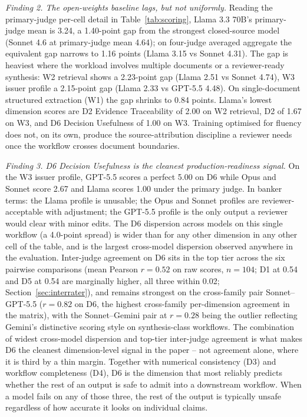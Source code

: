 \documentclass[11pt]{article}
\begin{document}
\textit{Finding 2. The open-weights baseline lags, but not uniformly.} Reading the primary-judge per-cell detail in Table~\ref{tab:scoring}, Llama 3.3 70B's primary-judge mean is 3.24, a 1.40-point gap from the strongest closed-source model (Sonnet 4.6 at primary-judge mean 4.64); on four-judge averaged aggregate the equivalent gap narrows to 1.16 points (Llama 3.15 vs Sonnet 4.31). The gap is heaviest where the workload involves multiple documents or a reviewer-ready synthesis: W2 retrieval shows a 2.23-point gap (Llama 2.51 vs Sonnet 4.74), W3 issuer profile a 2.15-point gap (Llama 2.33 vs GPT-5.5 4.48). On single-document structured extraction (W1) the gap shrinks to 0.84 points. Llama's lowest dimension scores are D2 Evidence Traceability of 2.00 on W2 retrieval, D2 of 1.67 on W3, and D6 Decision Usefulness of 1.00 on W3. Training optimised for fluency does not, on its own, produce the source-attribution discipline a reviewer needs once the workflow crosses document boundaries.

\textit{Finding 3. D6 Decision Usefulness is the cleanest production-readiness signal.} On the W3 issuer profile, GPT-5.5 scores a perfect 5.00 on D6 while Opus and Sonnet score 2.67 and Llama scores 1.00 under the primary judge. In banker terms: the Llama profile is unusable; the Opus and Sonnet profiles are reviewer-acceptable with adjustment; the GPT-5.5 profile is the only output a reviewer would clear with minor edits. The D6 dispersion across models on this single workflow (a 4.0-point spread) is wider than for any other dimension in any other cell of the table, and is the largest cross-model dispersion observed anywhere in the evaluation. Inter-judge agreement on D6 sits in the top tier across the six pairwise comparisons (mean Pearson $r = 0.52$ on raw scores, $n = 104$; D1 at 0.54 and D5 at 0.54 are marginally higher, all three within 0.02; Section~\ref{sec:interrater}), and remains strongest on the cross-family pair Sonnet--GPT-5.5 ($r = 0.82$ on D6, the highest cross-family per-dimension agreement in the matrix), with the Sonnet--Gemini pair at $r = 0.28$ being the outlier reflecting Gemini's distinctive scoring style on synthesis-class workflows. The combination of widest cross-model dispersion and top-tier inter-judge agreement is what makes D6 the cleanest dimension-level signal in the paper -- not agreement alone, where it is third by a thin margin. Together with numerical consistency (D3) and workflow completeness (D4), D6 is the dimension that most reliably predicts whether the rest of an output is safe to admit into a downstream workflow. When a model fails on any of those three, the rest of the output is typically unsafe regardless of how accurate it looks on individual claims.
\end{document}
